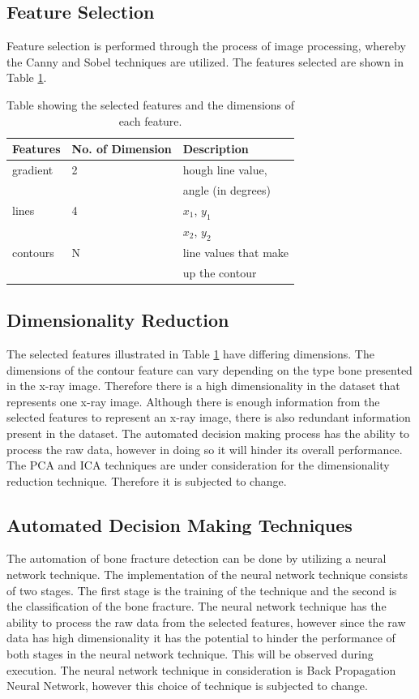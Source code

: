 \documentclass[11pt,twocolumn]{witseiepaper}
\begin{document}
	\subsection{Feature Selection}
	Feature selection is performed through the process of image processing, whereby the Canny and Sobel techniques are utilized. The features selected are shown in Table \ref{feature_selection}.
	
	\begin{table}[!h]
		\centering
		\caption{Table showing the selected features and the dimensions of each feature.}
		\label{feature_selection}
		\begin{tabular}{|l|p{2cm}|l|}
			\hline
			Features & No. of Dimension & Description \\
			\hline \hline
			gradient & 2 & hough line value, \\
			& & angle (in degrees)\\
			\hline
			lines    & 4 & $x_{1}$, $y_{1}$ \\
			& & $x_{2}$, $y_{2}$ \\
			\hline
			contours & N  & line values that make \\
			& & up the contour\\
			\hline
		\end{tabular}
	\end{table}
	
	\subsection{Dimensionality Reduction}
	The selected features illustrated in Table \ref{feature_selection} have differing dimensions. The dimensions of the contour feature can vary depending on the type bone presented in the x-ray image. Therefore there is a high dimensionality in the dataset that represents one x-ray image. Although there is enough information from the selected features to represent an x-ray image, there is also redundant information present in the dataset. The automated decision making process has the ability to process the raw data, however in doing so it will hinder its overall performance. The PCA and ICA techniques are under consideration for the dimensionality reduction technique. Therefore it is subjected to change. 
	
	\subsection{Automated Decision Making Techniques}
	The automation of bone fracture detection can be done by utilizing a neural network technique. The implementation of the neural network technique consists of two stages. The first stage is the training of the technique and the second is the classification of the bone fracture. The neural network technique has the ability to process the raw data from the selected features, however since the raw data has high dimensionality it has the potential to hinder the performance of both stages in the neural network technique. This will be observed during execution. The neural network technique in consideration is Back Propagation Neural Network, however this choice of technique is subjected to change.
	
\end{document}
